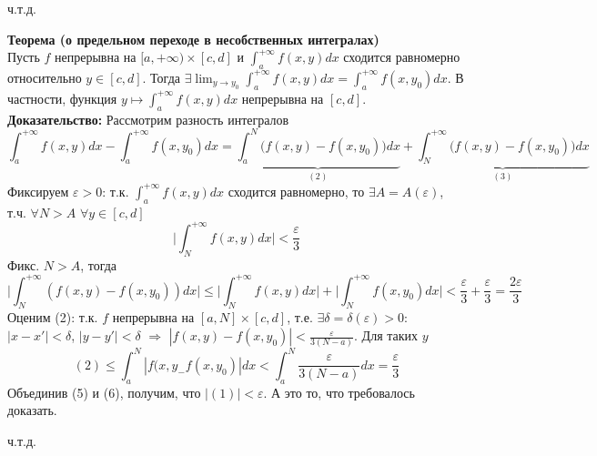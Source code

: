 \documentclass[book, 11pt]{report}
\begin{document}
\par{{\raggedleft ч.т.д.\par}}
    \vspace{1.5cm}
\par{\textbf{Теорема (о предельном переходе в несобственных интегралах)}\\
Пусть $f$ непрерывна на $[a,+\infty)\times[c,d]$ и $\displaystyle\int_a^{+\infty}f(x,y)dx$ сходится равномерно относительно $y\in[c,d]$. Тогда $\displaystyle\exists\lim_{y\to y_0}\int_a^{+\infty}f(x,y)dx=\int_a^{+\infty}f(x,y_0)dx$. В частности, функция $\displaystyle y\mapsto\int_a^{+\infty}f(x,y)dx$ непрерывна на $[c,d]$. \\
\textbf{Доказательство: } Рассмотрим разность интегралов
\begin{equation}
    \int_a^{+\infty}f(x,y)dx-\int_a^{+\infty}f(x,y_0)dx=\underbrace{\int_a^N\bigg(f(x,y)-f(x,y_0)\bigg)dx}_{(2)}+\underbrace{\int_N^{+\infty}\bigg(f(x,y)-f(x,y_0)\bigg)dx}_{(3)}
\end{equation}
Фиксируем $\varepsilon>0$: т.к. $\displaystyle\int_a^{+\infty}f(x,y)dx$ сходится равномерно, то $\exists A=A(\varepsilon)$, т.ч. $\forall N>A$ $\forall y\in[c,d]$
\setcounter{equation}{3}
\begin{equation}
\bigg|\int_N^{+\infty}f(x,y)dx\bigg|<\frac{\varepsilon}{3}
\end{equation}
Фикс. $N>A$, тогда
\begin{equation}
    \bigg|\int_N^{+\infty}(f(x,y)-f(x,y_0))dx\bigg|\leq\bigg|\int_N^{+\infty}f(x,y)dx\bigg|+\bigg|\int_N^{+\infty}f(x,y_0)dx\bigg|<\frac{\varepsilon}{3}+\frac{\varepsilon}{3}=\frac{2\varepsilon}{3}
\end{equation}
Оценим (2): т.к. $f$ непрерывна на $[a,N]\times[c,d]$, т.е. $\exists\delta=\delta(\varepsilon)>0$: $|x-x'|<\delta$, $|y-y'|<\delta$ $\Rightarrow$ $|f(x,y)-f(x,y_0)|<\frac{\varepsilon}{3(N-a)}$. Для таких $y$
\begin{equation}
    (2)\leq\int_a^N|f(x,y_-f(x,y_0)|dx<\int_a^N\frac{\varepsilon}{3(N-a)}dx=\frac{\varepsilon}{3}
\end{equation}
Объединив (5) и (6), получим, что $|(1)|<\varepsilon$. А это то, что требовалось доказать.
}
\par{{\raggedleft ч.т.д.\par}}
    \vspace{1.5cm}
\setcounter{equation}{0}
\end{document}
